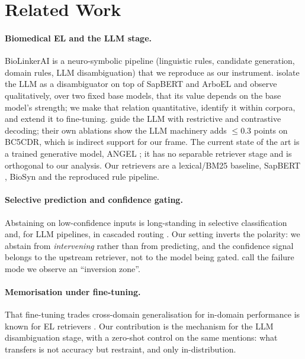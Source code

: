 \documentclass[11pt]{article}
\begin{document}
\section{Related Work}

\paragraph{Biomedical EL and the LLM stage.}
BioLinkerAI \citep{sakor-etal-2024-biolinkerai} is a neuro-symbolic pipeline
(linguistic rules, candidate generation, domain rules, LLM disambiguation) that we
reproduce as our instrument. \citet{ye-mitchell-2025-llm} isolate the LLM as a
disambiguator on top of SapBERT and ArboEL and observe qualitatively, over two fixed
base models, that its value depends on the base model's strength; we make that
relation quantitative, identify it within corpora, and extend it to fine-tuning.
\citet{lin-etal-2025-guiding} guide the LLM with restrictive and contrastive decoding;
their own ablations show the LLM machinery adds $\leq 0.3$ points on BC5CDR, which is
indirect support for our frame. The current state of the art is a trained generative
model, ANGEL \citep{kim-etal-2025-angel}; it has no separable retriever stage and is
orthogonal to our analysis. Our retrievers are a lexical/BM25 baseline, SapBERT
\citep{liu-etal-2021-self}, BioSyn \citep{sung-etal-2020-biomedical} and the
reproduced rule pipeline.

\paragraph{Selective prediction and confidence gating.}
Abstaining on low-confidence inputs is long-standing in selective classification
\citep{geifman-elyaniv-2017-selectivenet} and, for LLM pipelines, in cascaded routing
\citep{chen-etal-2023-frugalgpt}. Our setting inverts the polarity: we abstain from
\emph{intervening} rather than from predicting, and the confidence signal belongs to
the upstream retriever, not to the model being gated. \citet{doku-2026-confidence}
call the failure mode we observe an ``inversion zone''.

\paragraph{Memorisation under fine-tuning.}
That fine-tuning trades cross-domain generalisation for in-domain performance is known
for EL retrievers \citep{logeswaran-etal-2019-zero}. Our contribution is the
mechanism for the LLM disambiguation stage, with a zero-shot control on the same
mentions: what transfers is not accuracy but restraint, and only in-distribution.
\end{document}
